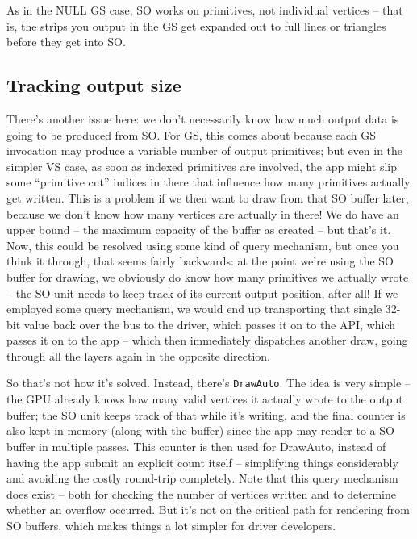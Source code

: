 \documentclass[12pt]{article}
\begin{document}
As in the NULL GS case, SO works on primitives, not individual vertices – that is, the strips you output in the GS get expanded out to full lines or triangles before they get into SO.

\subsection{Tracking output size}
\label{sec:org63f8307}

There’s another issue here: we don’t necessarily know how much output data is going to be produced from SO. For GS, this comes about because each GS invocation may produce a variable number of output primitives; but even in the simpler VS case, as soon as indexed primitives are involved, the app might slip some “primitive cut” indices in there that influence how many primitives actually get written. This is a problem if we then want to draw from that SO buffer later, because we don’t know how many vertices are actually in there! We do have an upper bound – the maximum capacity of the buffer as created – but that’s it. Now, this could be resolved using some kind of query mechanism, but once you think it through, that seems fairly backwards: at the point we’re using the SO buffer for drawing, we obviously do know how many primitives we actually wrote – the SO unit needs to keep track of its current output position, after all! If we employed some query mechanism, we would end up transporting that single 32-bit value back over the bus to the driver, which passes it on to the API, which passes it on to the app – which then immediately dispatches another draw, going through all the layers again in the opposite direction.

So that’s not how it’s solved. Instead, there’s \texttt{DrawAuto}. The idea is very simple – the GPU already knows how many valid vertices it actually wrote to the output buffer; the SO unit keeps track of that while it’s writing, and the final counter is also kept in memory (along with the buffer) since the app may render to a SO buffer in multiple passes. This counter is then used for DrawAuto, instead of having the app submit an explicit count itself – simplifying things considerably and avoiding the costly round-trip completely. Note that this query mechanism does exist – both for checking the number of vertices written and to determine whether an overflow occurred. But it’s not on the critical path for rendering from SO buffers, which makes things a lot simpler for driver developers.
\end{document}
